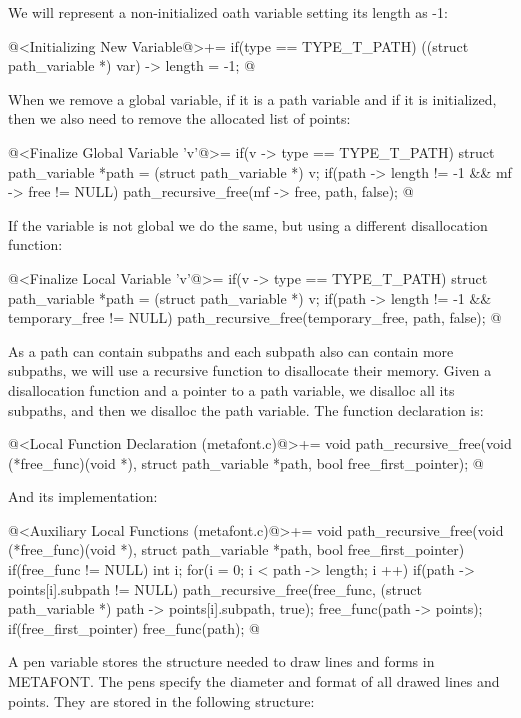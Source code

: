 We will represent a non-initialized oath variable setting its length
as -1:

\iniciocodigo
@<Initializing New Variable@>+=
if(type == TYPE_T_PATH){
  ((struct path_variable *) var) -> length = -1;
}
@
\fimcodigo

When we remove a global variable, if it is a path variable and if it
is initialized, then we also need to remove the allocated list of
points:

\iniciocodigo
@<Finalize Global Variable 'v'@>=
if(v -> type == TYPE_T_PATH){
  struct path_variable *path = (struct path_variable *) v;
  if(path -> length != -1 && mf -> free != NULL)
    path_recursive_free(mf -> free, path, false);
}
@
\fimcodigo

If the variable is not global we do the same, but using a different
disallocation function:

\iniciocodigo
@<Finalize Local Variable 'v'@>=
if(v -> type == TYPE_T_PATH){
  struct path_variable *path = (struct path_variable *) v;
  if(path -> length != -1 && temporary_free != NULL)
    path_recursive_free(temporary_free, path, false);
}
@
\fimcodigo

As a path can contain subpaths and each subpath also can contain more
subpaths, we will use a recursive function to disallocate their
memory. Given a disallocation function and a pointer to a path
variable, we disalloc all its subpaths, and then we disalloc the path
variable. The function declaration is:

\iniciocodigo
@<Local Function Declaration (metafont.c)@>+=
void path_recursive_free(void (*free_func)(void *),
                         struct path_variable *path,
                         bool free_first_pointer);
@
\fimcodigo

And its implementation:

\iniciocodigo
@<Auxiliary Local Functions (metafont.c)@>+=
void path_recursive_free(void (*free_func)(void *),
                         struct path_variable *path,
                         bool free_first_pointer){
  if(free_func != NULL){
    int i;
    for(i = 0; i < path -> length; i ++){
      if(path -> points[i].subpath != NULL)
        path_recursive_free(free_func, (struct path_variable *)
                                       path -> points[i].subpath, true);
    }
    free_func(path -> points);
    if(free_first_pointer)
      free_func(path);
  }
}
@
\fimcodigo


A pen variable stores the structure needed to draw lines and forms in
METAFONT. The pens specify the diameter and format of all drawed lines
and points. They are stored in the following structure:

